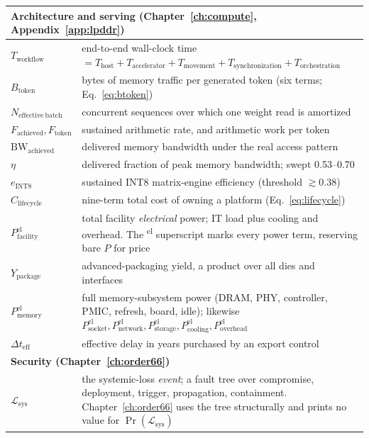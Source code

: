 \begin{longtable}{p{26mm}p{112mm}}
\midrule
\multicolumn{2}{l}{\textbf{Architecture and serving (Chapter~\ref{ch:compute}, Appendix~\ref{app:lpddr})}} \\
\midrule
$T_{\mathrm{workflow}}$ & end-to-end wall-clock time $= T_{\mathrm{host}} + T_{\mathrm{accelerator}} + T_{\mathrm{movement}} + T_{\mathrm{synchronization}} + T_{\mathrm{orchestration}}$ \\
$B_{\mathrm{token}}$ & bytes of memory traffic per generated token (six terms; Eq.~\ref{eq:btoken}) \\
$N_{\mathrm{effective\ batch}}$ & concurrent sequences over which one weight read is amortized \\
$F_{\mathrm{achieved}}, F_{\mathrm{token}}$ & sustained arithmetic rate, and arithmetic work per token \\
$\mathrm{BW}_{\mathrm{achieved}}$ & delivered memory bandwidth under the real access pattern \\
$\eta$ & delivered fraction of peak memory bandwidth; swept 0.53--0.70 \\
$e_{\mathrm{INT8}}$ & sustained INT8 matrix-engine efficiency (threshold $\gtrsim$0.38) \\
$C_{\mathrm{lifecycle}}$ & nine-term total cost of owning a platform (Eq.~\ref{eq:lifecycle}) \\
$P^{\mathrm{el}}_{\text{facility}}$ & total facility \emph{electrical} power; IT load plus cooling and overhead. The \textsuperscript{el} superscript marks every power term, reserving bare $P$ for price \\
$Y_{\mathrm{package}}$ & advanced-packaging yield, a product over all dies and interfaces \\
$P^{\mathrm{el}}_{\mathrm{memory}}$ & full memory-subsystem power (DRAM, PHY, controller, PMIC, refresh, board, idle); likewise $P^{\mathrm{el}}_{\text{socket}}, P^{\mathrm{el}}_{\text{network}}, P^{\mathrm{el}}_{\text{storage}}, P^{\mathrm{el}}_{\text{cooling}}, P^{\mathrm{el}}_{\text{overhead}}$ \\
$\Delta t_{\text{eff}}$ & effective delay in years purchased by an export control \\
\midrule
\multicolumn{2}{l}{\textbf{Security (Chapter~\ref{ch:order66})}} \\
\midrule
$\mathcal{L}_{\mathrm{sys}}$ & the systemic-loss \emph{event}; a fault tree over compromise, deployment, trigger, propagation, containment. Chapter~\ref{ch:order66} uses the tree structurally and prints no value for $\Pr(\mathcal{L}_{\mathrm{sys}})$ \\

\end{longtable}
